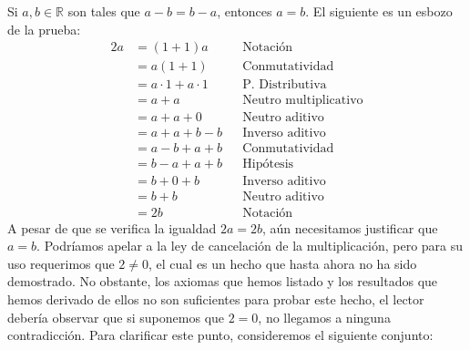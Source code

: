 \documentclass[11pt]{article}
\newcommand{\R}{\mathbb{R}}
\begin{document}
Si $a,b\in \R$ son tales que $a-b=b-a$, entonces $a=b$. El siguiente es un esbozo de la prueba: \begin{align*}
    2a &= (1+1)a && \text{Notación}\\
    &= a(1+1) && \text{Conmutatividad}\\
    &= a\cdot 1 + a\cdot 1 && \text{P. Distributiva}\\
    &= a + a && \text{Neutro multiplicativo}\\
    &= a +a + 0&& \text{Neutro aditivo}\\
    &= a+a+b-b && \text{Inverso aditivo}\\
    &= a-b+a+b && \text{Conmutatividad}\\
    &= b-a +a +b && \text{Hipótesis}\\
    &= b+0 + b && \text{Inverso aditivo}\\
    &= b+b && \text{Neutro aditivo}\\
    &= 2b && \text{Notación}
\end{align*}
A pesar de que se verifica la igualdad $2a=2b$, aún necesitamos justificar que $a=b$. Podríamos apelar a la ley de cancelación de la multiplicación, pero para su uso requerimos que $2\neq 0$, el cual es un hecho que hasta ahora no ha sido demostrado. No obstante, los axiomas que hemos listado y los resultados que hemos derivado de ellos no son suficientes para probar este hecho, el lector debería observar que si suponemos que $2=0$, no llegamos a ninguna contradicción. Para clarificar este punto, consideremos el siguiente conjunto: %
\end{document}
